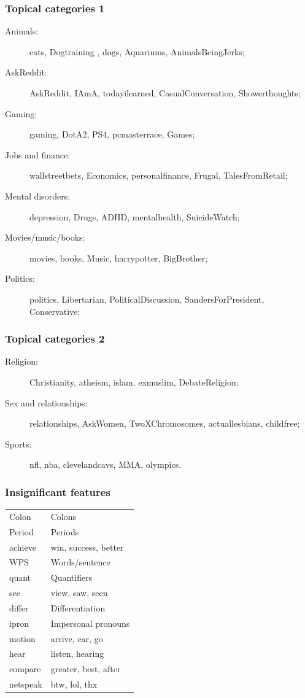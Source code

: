\documentclass{beamer}
\begin{document}
\begin{frame}[noframenumbering]
  \frametitle{Topical categories 1}
  \begin{description}
    \item [Animals:] cats, Dogtraining , dogs, Aquariums, AnimalsBeingJerks;
    \item [AskReddit:] AskReddit, IAmA, todayilearned, CasualConversation, Showerthoughts;
    \item [Gaming:] gaming, DotA2, PS4, pcmasterrace, Games;
    \item [Jobs and finance:] wallstreetbets, Economics, personalfinance, Frugal, TalesFromRetail;
    \item [Mental disorders:] depression, Drugs, ADHD, mentalhealth, SuicideWatch;
    \item [Movies/music/books:] movies, books, Music, harrypotter, BigBrother;
    \item [Politics:] politics, Libertarian, PoliticalDiscussion, SandersForPresident, Conservative;
  \end{description}
\end{frame}

\begin{frame}[noframenumbering]
  \frametitle{Topical categories 2}
  \begin{description}
    \item [Religion:] Christianity, atheism, islam, exmuslim, DebateReligion;
    \item [Sex and relationships:] relationships, AskWomen, TwoXChromosomes, actuallesbians, childfree;
    \item [Sports:] nfl, nba, clevelandcavs, MMA, olympics.
  \end{description}
\end{frame}

\begin{frame}[noframenumbering]
  \frametitle{Insignificant features}
  \begin{table}
    \centering
    \begin{tabular}{ll}
      \toprule
      Colon & Colons\\
      Period & Periods\\
      achieve & win, success, better\\
      WPS & Words/sentence \\
      quant & Quantifiers\\
      see & view, saw, seen \\
      differ & Differentiation\\
      ipron & Impersonal pronouns\\
      motion & arrive, car, go\\
      hear & listen, hearing\\
      compare & greater, best, after\\
      netspeak & btw, lol, thx\\
      \bottomrule
    \end{tabular}
  \end{table}
\end{frame}
\end{document}
